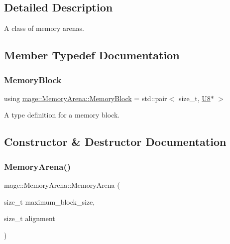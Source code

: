 \subsection{Detailed Description}
A class of memory arenas. 

\subsection{Member Typedef Documentation}
\mbox{\label{classmage_1_1_memory_arena_a133e9d40bd216e3f1d98c6a2b36cf373}} 
\subsubsection{\texorpdfstring{Memory\+Block}{MemoryBlock}}
{\footnotesize\ttfamily using \mbox{\hyperlink{classmage_1_1_memory_arena_a133e9d40bd216e3f1d98c6a2b36cf373}{mage\+::\+Memory\+Arena\+::\+Memory\+Block}} =  std\+::pair$<$ size\+\_\+t, \mbox{\hyperlink{namespacemage_afc638980bc6154f15af5e2d93a0e0ea9}{U8}}$\ast$ $>$\hspace{0.3cm}{\ttfamily [private]}}

A type definition for a memory block. 

\subsection{Constructor \& Destructor Documentation}
\mbox{\label{classmage_1_1_memory_arena_a139f7781be209bb29e7ad0ed04cb32a5}} 
\subsubsection{\texorpdfstring{Memory\+Arena()}{MemoryArena()}\hspace{0.1cm}{\footnotesize\ttfamily [1/3]}}
{\footnotesize\ttfamily mage\+::\+Memory\+Arena\+::\+Memory\+Arena (\begin{DoxyParamCaption}\item[{size\+\_\+t}]{maximum\+\_\+block\+\_\+size,  }\item[{size\+\_\+t}]{alignment }\end{DoxyParamCaption})\hspace{0.3cm}{\ttfamily [explicit]}}

